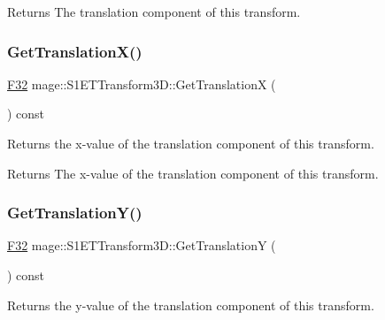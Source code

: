 \begin{DoxyReturn}{Returns}
The translation component of this transform. 
\end{DoxyReturn}
\mbox{\label{classmage_1_1_s1_e_t_transform3_d_abba6f982423e10eace0718dfee916000}} 
\subsubsection{\texorpdfstring{Get\+Translation\+X()}{GetTranslationX()}}
{\footnotesize\ttfamily \mbox{\hyperlink{namespacemage_aa97e833b45f06d60a0a9c4fc22ae02c0}{F32}} mage\+::\+S1\+E\+T\+Transform3\+D\+::\+Get\+TranslationX (\begin{DoxyParamCaption}{ }\end{DoxyParamCaption}) const\hspace{0.3cm}{\ttfamily [noexcept]}}

Returns the x-\/value of the translation component of this transform.

\begin{DoxyReturn}{Returns}
The x-\/value of the translation component of this transform. 
\end{DoxyReturn}
\mbox{\label{classmage_1_1_s1_e_t_transform3_d_ade8e64e1aade03448dd31ae9757bd1eb}} 
\subsubsection{\texorpdfstring{Get\+Translation\+Y()}{GetTranslationY()}}
{\footnotesize\ttfamily \mbox{\hyperlink{namespacemage_aa97e833b45f06d60a0a9c4fc22ae02c0}{F32}} mage\+::\+S1\+E\+T\+Transform3\+D\+::\+Get\+TranslationY (\begin{DoxyParamCaption}{ }\end{DoxyParamCaption}) const\hspace{0.3cm}{\ttfamily [noexcept]}}

Returns the y-\/value of the translation component of this transform.

